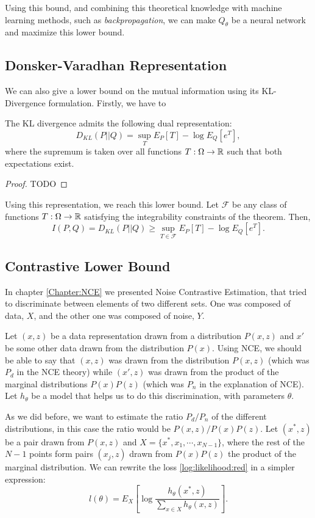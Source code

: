 Using this bound, and combining this theoretical knowledge with machine learning methods, such as \emph{backpropagation}, we can make $Q_\theta$ be a neural network and maximize this lower bound.

\subsection*{Donsker-Varadhan Representation}

We can also give a lower bound on the mutual information using its KL-Divergence formulation. Firstly, we have to 

\begin{nth}
The KL divergence admits the following dual representation:
\[
D_{KL}(P || Q) = \sup_{T} E_P[T] - \log E_Q[e^T],
\]
where the supremum is taken over all functions $T:\Omega \to \mathbb{R}$ such that both expectations exist.
\end{nth}
\begin{proof}
    TODO
\end{proof}

Using this representation, we reach this lower bound. Let $\mathcal F$ be any class of functions $T: \Omega \to \mathbb{R}$ satisfying the integrability constraints of the theorem. Then, 
$$
I(P,Q) = D_{KL}(P||Q) \geq \sup_{T \in \mathcal F} E_P[T] - \log E_Q[e^T].
$$

\subsection*{Contrastive Lower Bound}

In chapter \ref{Chapter:NCE} we presented Noise Contrastive Estimation, that tried to discriminate between elements of two different sets. One was composed of data, $X$, and the other one was composed of noise, $Y$.

Let $(x,z)$ be a data representation drawn from a distribution $P(x,z)$ and $x'$ be some other data drawn from the distribution $P(x)$. Using NCE, we should be able to say that $(x,z)$ was drawn from the distribution $P(x,z)$ (which was $P_d$ in the NCE theory) while $(x',z)$ was drawn from the product of the marginal distributions $P(x)P(z)$ (which was $P_n$ in the explanation of NCE). Let $h_\theta$ be a model that helps us to do this discrimination, with parameters $\theta$. 

As we did before, we want to estimate the ratio $P_d/P_n$ of the different distributions, in this case the ratio would be $P(x,z)/P(x)P(z)$. Let $(x^*,z)$ be a pair drawn from $P(x,z)$ and $X = \{x^*, x_1,\cdots,x_{N-1} \}$, where the rest of the $N-1$ points form pairs $(x_j,z)$ drawn from $P(x)P(z)$ the product of the marginal distribution. We can rewrite the loss \ref{log:likelihood:red} in a simpler expression:
\begin{equation}\label{log:likelihood:rewritten}
l(\theta) = E_X \left[ \log \frac{h_\theta(x^*,z)}{\sum_{x \in X}h_\theta(x,z)}\right]  .
\end{equation}

